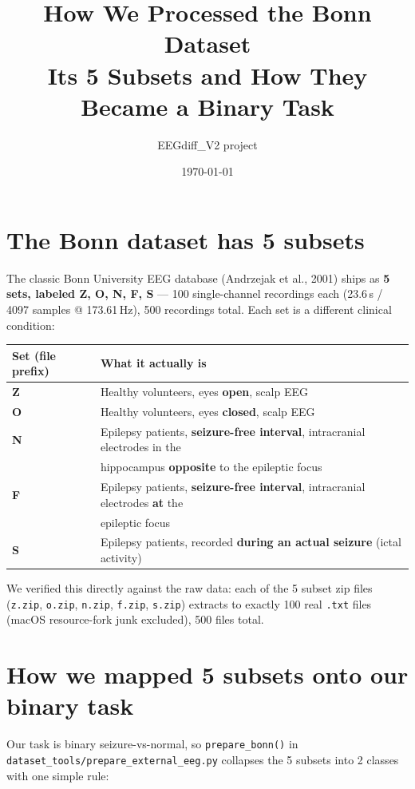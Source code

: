 \documentclass[11pt]{article}
\title{\vspace{-1.5cm}\textbf{How We Processed the Bonn Dataset}\\[2pt]
\large Its 5 Subsets and How They Became a Binary Task}
\author{EEGdiff\_V2 project}
\date{\today}
\begin{document}
\maketitle
\vspace{-0.6cm}

\section{The Bonn dataset has 5 subsets}
The classic Bonn University EEG database (Andrzejak et al., 2001) ships as
\textbf{5 sets, labeled Z, O, N, F, S} --- 100 single-channel recordings each
(23.6\,s / 4097 samples @ 173.61\,Hz), 500 recordings total. Each set is a
different clinical condition:

\begin{center}
\begin{tabular}{@{}ll@{}}
\toprule
Set (file prefix) & What it actually is \\
\midrule
\textbf{Z} & Healthy volunteers, eyes \textbf{open}, scalp EEG \\
\textbf{O} & Healthy volunteers, eyes \textbf{closed}, scalp EEG \\
\textbf{N} & Epilepsy patients, \textbf{seizure-free interval}, intracranial electrodes in the \\
           & hippocampus \textbf{opposite} to the epileptic focus \\
\textbf{F} & Epilepsy patients, \textbf{seizure-free interval}, intracranial electrodes \textbf{at} the \\
           & epileptic focus \\
\textbf{S} & Epilepsy patients, recorded \textbf{during an actual seizure} (ictal activity) \\
\bottomrule
\end{tabular}
\end{center}

We verified this directly against the raw data: each of the 5 subset zip files
(\texttt{z.zip}, \texttt{o.zip}, \texttt{n.zip}, \texttt{f.zip}, \texttt{s.zip})
extracts to exactly 100 real \texttt{.txt} files (macOS resource-fork junk
excluded), 500 files total.

\section{How we mapped 5 subsets onto our binary task}
Our task is binary seizure-vs-normal, so \texttt{prepare\_bonn()} in
\texttt{dataset\_tools/prepare\_external\_eeg.py} collapses the 5 subsets into
2 classes with one simple rule:
\end{document}
